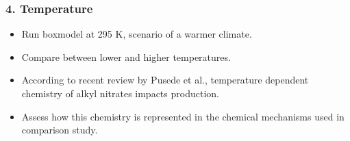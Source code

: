 {
    \begin{frame}[plain]
    \end{frame}
}

%

\begin{frame}
    \frametitle{4. Temperature}

    \vspace{-5mm}
    \begin{itemize}
        \item Run boxmodel at 295 K, scenario of a warmer climate. \vspace{3mm}
        \item Compare  between lower and higher temperatures. \vspace{3mm}
        \item According to recent review by Pusede et al., temperature dependent chemistry of alkyl nitrates impacts  production. \vspace{3mm}
        \item Assess how this chemistry is represented in the chemical mechanisms used in comparison study. 
    \end{itemize}
\end{frame}
